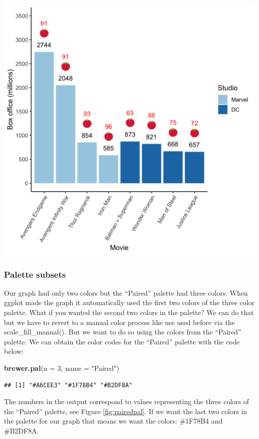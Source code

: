 \documentclass[
]{krantz}
\makeatletter
\newenvironment{Shaded}{\begin{snugshade}}{\end{snugshade}}
\newcommand{\DataTypeTok}[1]{\textcolor[rgb]{0.27,0.27,0.27}{#1}}
\newcommand{\DecValTok}[1]{\textcolor[rgb]{0.06,0.06,0.06}{#1}}
\newcommand{\KeywordTok}[1]{\textcolor[rgb]{0.27,0.27,0.27}{\textbf{#1}}}
\newcommand{\NormalTok}[1]{#1}
\newcommand{\StringTok}[1]{\textcolor[rgb]{0.5,0.5,0.5}{#1}}
\newenvironment{kframe}{%
\medskip{}
\setlength{\fboxsep}{.8em}
 \def\at@end@of@kframe{}%
 \ifinner\ifhmode%
  \def\at@end@of@kframe{\end{minipage}}%
  \begin{minipage}{\columnwidth}%
 \fi\fi%
 \def\FrameCommand##1{\hskip\@totalleftmargin \hskip-\fboxsep
 \colorbox{shadecolor}{##1}\hskip-\fboxsep
     \hskip-\linewidth \hskip-\@totalleftmargin \hskip\columnwidth}%
 \MakeFramed {\advance\hsize-\width
   \@totalleftmargin\z@ \linewidth\hsize
   \@setminipage}}%
 {\par\unskip\endMakeFramed%
 \at@end@of@kframe}
\renewenvironment{Shaded}{\begin{kframe}}{\end{kframe}}
\makeatother
\begin{document}
\includegraphics[width=0.85\linewidth]{ch_graphing/images/emoji_graph4}

\hypertarget{palette-subsets}{%
\subsubsection{Palette subsets}\label{palette-subsets}}

Our graph had only two colors but the ``Paired'' palette had three colors. When ggplot made the graph it automatically used the first two colors of the three color palette. What if you wanted the second two colors in the palette? We can do that but we have to revert to a manual color process like use used before via the scale\_fill\_manual(). But we want to do so using the colors from the ``Paired'' palette. We can obtain the color codes for the ``Paired'' palette with the code below:

\begin{Shaded}
\begin{Highlighting}[]
\KeywordTok{brewer.pal}\NormalTok{(}\DataTypeTok{n =} \DecValTok{3}\NormalTok{, }\DataTypeTok{name =} \StringTok{"Paired"}\NormalTok{)}
\end{Highlighting}
\end{Shaded}

\begin{verbatim}
## [1] "#A6CEE3" "#1F78B4" "#B2DF8A"
\end{verbatim}

The numbers in the output correspond to values representing the three colors of the ``Paired'' palette, see Figure \ref{fig:pairedpal}. If we want the last two colors in the palette for our graph that means we want the colors: \#1F78B4 and \#B2DF8A.
\end{document}
